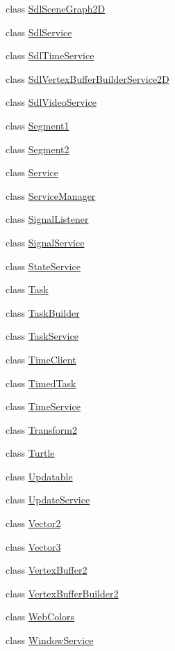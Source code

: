 \begin{DoxyCompactItemize}
class \hyperlink{classastu_1_1SdlSceneGraph2D}{Sdl\+Scene\+Graph2D}
\item 
class \hyperlink{classastu_1_1SdlService}{Sdl\+Service}
\item 
class \hyperlink{classastu_1_1SdlTimeService}{Sdl\+Time\+Service}
\item 
class \hyperlink{classastu_1_1SdlVertexBufferBuilderService2D}{Sdl\+Vertex\+Buffer\+Builder\+Service2D}
\item 
class \hyperlink{classastu_1_1SdlVideoService}{Sdl\+Video\+Service}
\item 
class \hyperlink{classastu_1_1Segment1}{Segment1}
\item 
class \hyperlink{classastu_1_1Segment2}{Segment2}
\item 
class \hyperlink{classastu_1_1Service}{Service}
\item 
class \hyperlink{classastu_1_1ServiceManager}{Service\+Manager}
\item 
class \hyperlink{classastu_1_1SignalListener}{Signal\+Listener}
\item 
class \hyperlink{classastu_1_1SignalService}{Signal\+Service}
\item 
class \hyperlink{classastu_1_1StateService}{State\+Service}
\item 
class \hyperlink{classastu_1_1Task}{Task}
\item 
class \hyperlink{classastu_1_1TaskBuilder}{Task\+Builder}
\item 
class \hyperlink{classastu_1_1TaskService}{Task\+Service}
\item 
class \hyperlink{classastu_1_1TimeClient}{Time\+Client}
\item 
class \hyperlink{classastu_1_1TimedTask}{Timed\+Task}
\item 
class \hyperlink{classastu_1_1TimeService}{Time\+Service}
\item 
class \hyperlink{classastu_1_1Transform2}{Transform2}
\item 
class \hyperlink{classastu_1_1Turtle}{Turtle}
\item 
class \hyperlink{classastu_1_1Updatable}{Updatable}
\item 
class \hyperlink{classastu_1_1UpdateService}{Update\+Service}
\item 
class \hyperlink{classastu_1_1Vector2}{Vector2}
\item 
class \hyperlink{classastu_1_1Vector3}{Vector3}
\item 
class \hyperlink{classastu_1_1VertexBuffer2}{Vertex\+Buffer2}
\item 
class \hyperlink{classastu_1_1VertexBufferBuilder2}{Vertex\+Buffer\+Builder2}
\item 
class \hyperlink{classastu_1_1WebColors}{Web\+Colors}
\item 
class \hyperlink{classastu_1_1WindowService}{Window\+Service}
\end{DoxyCompactItemize}
